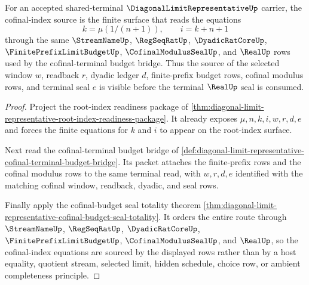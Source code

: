 \begin{theorem}
\label{thm:diagonal-limit-representative-cofinal-index-source}
For an accepted shared-terminal $\DiagonalLimitRepresentativeUp$ carrier, the cofinal-index source is the finite surface that reads the equations
$$
k=\mu(1/(n+1)),\qquad i=k+n+1
$$
through the same $\StreamNameUp$, $\RegSeqRatUp$, $\DyadicRatCoreUp$, $\FinitePrefixLimitBudgetUp$, $\CofinalModulusSealUp$, and $\RealUp$ rows used by the cofinal-terminal budget bridge. Thus the source of the selected window $w$, readback $r$, dyadic ledger $d$, finite-prefix budget rows, cofinal modulus rows, and terminal seal $e$ is visible before the terminal $\RealUp$ seal is consumed.
\end{theorem}
\begin{proof}
Project the root-index readiness package of \autoref{thm:diagonal-limit-representative-root-index-readiness-package}. It already exposes $\mu,n,k,i,w,r,d,e$ and forces the finite equations for $k$ and $i$ to appear on the root-index surface.

Next read the cofinal-terminal budget bridge of \autoref{def:diagonal-limit-representative-cofinal-terminal-budget-bridge}. Its packet attaches the finite-prefix rows and the cofinal modulus rows to the same terminal read, with $w,r,d,e$ identified with the matching cofinal window, readback, dyadic, and seal rows.

Finally apply the cofinal-budget seal totality theorem \autoref{thm:diagonal-limit-representative-cofinal-budget-seal-totality}. It orders the entire route through $\StreamNameUp$, $\RegSeqRatUp$, $\DyadicRatCoreUp$, $\FinitePrefixLimitBudgetUp$, $\CofinalModulusSealUp$, and $\RealUp$, so the cofinal-index equations are sourced by the displayed rows rather than by a host equality, quotient stream, selected limit, hidden schedule, choice row, or ambient completeness principle.
\end{proof}

